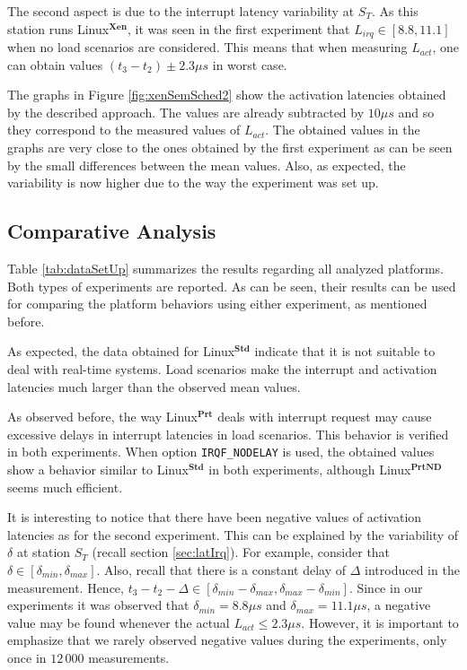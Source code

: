 \documentclass{acm_proc_article-sp}
\newcommand{\cod}[1]{\hspace{0.1cm}\texttt{#1}}
\begin{document}
The second aspect is due to the interrupt latency variability at $S_T$. As this
station runs Linux$^\mathbf{Xen}$, it was seen in the first experiment that $L_{irq}
\in [8.8,11.1]$ when no load scenarios are considered. This means that when
measuring $L_{act}$, one can obtain values $(t_3 - t_2) \pm 2.3 \mu s$ in worst
case.

The graphs in Figure \ref{fig:xenSemSched2} show the activation latencies obtained
by the described approach. The values are already subtracted by $10 \mu s$ and so
they correspond to the measured values of $L_{act}$. The obtained values in
the graphs are very close to the ones obtained by the first experiment as can be
seen by the small differences between the mean values. Also, as expected, the variability
is now higher due to the way the experiment was set up.

\subsection{Comparative Analysis}
\label{sec:compTable}

Table \ref{tab:dataSetUp} summarizes the results regarding all analyzed platforms.
Both types of experiments are reported. As can be seen, their results can be used
for comparing the platform behaviors using either experiment, as mentioned before.

As expected, the data obtained for Linux$^\mathbf{Std}$ indicate that it is not
suitable to deal with real-time systems. Load scenarios make the interrupt and
activation latencies much larger than the observed mean values.

As observed before, the way Linux$^\mathbf{Prt}$ deals with interrupt request may
cause excessive delays in interrupt latencies in load scenarios. This behavior is
verified in both experiments. When option \cod{IRQF\_NODELAY} is used, the
obtained values show a behavior similar to Linux$^\mathbf{Std}$ in both experiments,
although Linux$^\mathbf{PrtND}$ seems much efficient.

It is interesting to notice that there have been negative values of activation
latencies as for the second experiment.  This can be explained by the variability of
$\delta$ at station $S_T$ (recall section \ref{sec:latIrq}).  For example, consider
that $\delta \in [\delta_{min},\delta_{max}]$. Also, recall that there is a constant
delay of $\Delta$ introduced in the measurement. Hence, $t_3 - t_2 - \Delta \in
[\delta_{min}-\delta_{max},\delta_{max}-\delta_{min}]$. Since in our experiments it
was observed that $\delta_{min} = 8.8 \mu s$ and $\delta_{max} = 11.1 \mu s$, a
negative value may be found whenever the actual $L_{act} \leq 2.3 \mu s$. However,
it is important to emphasize that we rarely observed negative values during the
experiments, only once in $12\,000$ measurements.
\end{document}
